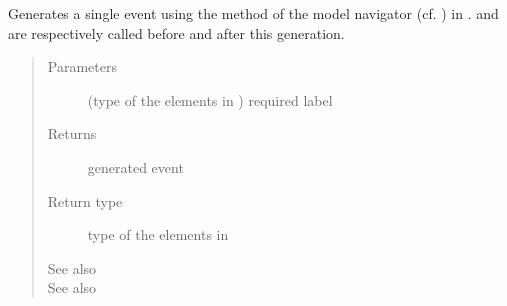 \documentclass[letterpaper,10pt,english]{sphinxmanual}
\begin{document}
\begin{fulllineitems}
\begin{fulllineitems}
\begin{quote}
\begin{description}
\end{description}\end{quote}

\end{fulllineitems}


\begin{fulllineitems}
\label{\detokenize{index:Generator.Generator.handle_generation_matching_label}}
Generates a single event using the method {\hyperref[\detokenize{index:Navigator.Navigator.simply_guided_generation}]{}} of the model navigator (cf. ) in . {\hyperref[\detokenize{index:Generator.Generator.encode_memory_with_current_transfo}]{}} and {\hyperref[\detokenize{index:Generator.Generator.decode_memory_with_current_transfo}]{}} are respectively called before and after this generation.
\begin{quote}\begin{description}
\item[{Parameters}] \leavevmode
{} (type of the elements in ) \textendash{} required label

\item[{Returns}] \leavevmode
generated event

\item[{Return type}] \leavevmode
type of the elements in 

\item[{See also}] \leavevmode
{}

\item[{See also}] \leavevmode
{\hyperref[\detokenize{index:module-MetaModelNavigator}]{}}

\end{description}\end{quote}

\end{fulllineitems}



\end{fulllineitems}
\end{document}
